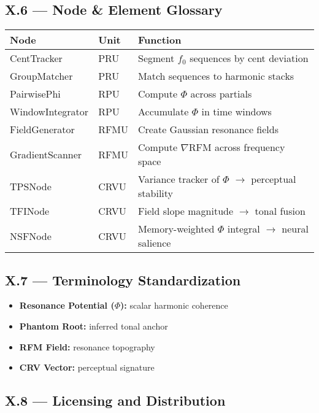 \documentclass{article}
\begin{document}
\subsection*{X.6 — Node \& Element Glossary}

\begin{center}
\begin{tabular}{|l|l|p{7.5cm}|}
\hline
\textbf{Node} & \textbf{Unit} & \textbf{Function} \\
\hline
CentTracker & PRU & Segment $f_0$ sequences by cent deviation \\
GroupMatcher & PRU & Match sequences to harmonic stacks \\
PairwisePhi & RPU & Compute $\Phi$ across partials \\
WindowIntegrator & RPU & Accumulate $\Phi$ in time windows \\
FieldGenerator & RFMU & Create Gaussian resonance fields \\
GradientScanner & RFMU & Compute $\nabla$RFM across frequency space \\
TPSNode & CRVU & Variance tracker of $\Phi$ $\rightarrow$ perceptual stability \\
TFINode & CRVU & Field slope magnitude $\rightarrow$ tonal fusion \\
NSFNode & CRVU & Memory-weighted $\Phi$ integral $\rightarrow$ neural salience \\
\hline
\end{tabular}
\end{center}

\subsection*{X.7 — Terminology Standardization}

\begin{itemize}
    \item \textbf{Resonance Potential ($\Phi$):} scalar harmonic coherence
    \item \textbf{Phantom Root:} inferred tonal anchor
    \item \textbf{RFM Field:} resonance topography
    \item \textbf{CRV Vector:} perceptual signature
\end{itemize}

\subsection*{X.8 — Licensing and Distribution}
\end{document}
